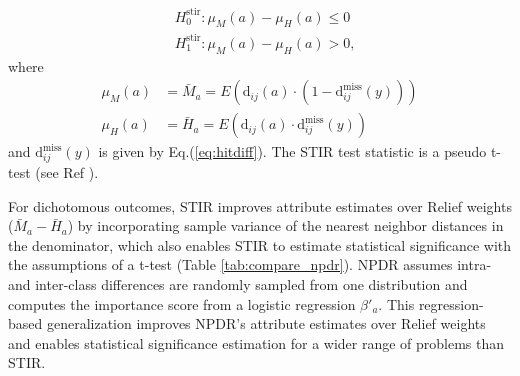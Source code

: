 \documentclass{bioinfo}
\begin{document}

\begin{equation}
\begin{aligned}
    & H^{\text{stir}}_0: \mu_M(a) - \mu_H(a) \le 0 \\
    & H^{\text{stir}}_1: \mu_M(a) - \mu_H(a) > 0,
\end{aligned}
\end{equation}  
where
\begin{equation}
\begin{aligned}
    \mu_M(a) & = \bar{M}_a = E \left( \text{d}_{ij}(a) \cdot \left( 1-\text{d}^{\text{miss}}_{ij}(y) \right) \right) \\
    \mu_H(a) & = \bar{H}_a = E \left( \text{d}_{ij}(a) \cdot        \text{d}^{\text{miss}}_{ij}(y)           \right)
\end{aligned}
\end{equation}  
and $\text{d}^{\text{miss}}_{ij}(y)$ is given by Eq.(\ref{eq:hitdiff}). The STIR test statistic is a pseudo t-test (see Ref \citep{stir}).

For dichotomous outcomes, STIR improves attribute estimates over Relief weights ($\bar{M}_a - \bar{H}_a$) by incorporating sample variance of the nearest neighbor distances in the denominator, which also enables STIR to estimate statistical significance with the assumptions of a t-test (Table \ref{tab:compare_npdr}).
NPDR assumes intra- and inter-class differences are randomly sampled from one distribution and computes the importance score from a logistic regression $\beta'_a$.
This regression-based generalization improves NPDR's attribute estimates over Relief weights and enables statistical significance estimation for a wider range of problems than STIR.
\end{document}
